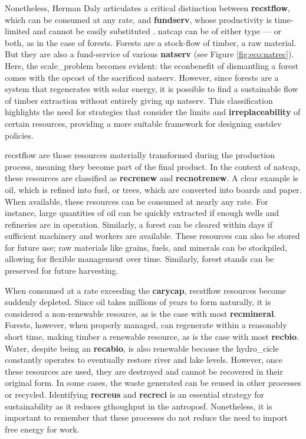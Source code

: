 \documentclass[./main_en.tex]{subfiles}
\begin{document}
\par Nonetheless, Herman Daly articulates a critical distinction between \textbf{\gls{recstflow}}, which can be consumed at any rate, and \textbf{\gls{fundserv}}, whose productivity is time-limited and cannot be easily substituted \cite{daly2011}. \gls{natcap} can be of either type — or both, as in the case of forests. Forests are a stock-flow of timber, a raw material. But they are also a fund-service of various \textbf{\gls{natserv}} (see Figure \ref{fig:eco:natrec}). Here, the \gls{scale_problem} becomes evident: the \gls{econbenefit} of dismantling a forest comes with the \gls{opcost} of the sacrificed \gls{natserv}. However, since forests are a \gls{system} that regenerates with solar energy, it is possible to find a sustainable flow of timber extraction without entirely giving up \gls{natserv}. This classification highlights the need for strategies that consider the limits and \textbf{irreplaceability} of certain resources, providing a more suitable framework for designing \gls{sustdev} policies.

\par \gls{recstflow} are those resources materially transformed during the production process, meaning they become part of the final product. In the context of \gls{natcap}, these resources are classified as \textbf{\gls{recrenew}} and \textbf{\gls{recnotrenew}}. A clear example is oil, which is refined into fuel, or trees, which are converted into boards and paper. When available, these resources can be consumed at nearly any rate. For instance, large quantities of oil can be quickly extracted if enough wells and refineries are in operation. Similarly, a forest can be cleared within days if sufficient machinery and workers are available. These resources can also be stored for future use; raw materials like grains, fuels, and minerals can be stockpiled, allowing for flexible management over time. Similarly, forest stands can be preserved for future harvesting.

\par When consumed at a rate exceeding the \textbf{\gls{carycap}}, \gls{recstflow} resources become suddenly depleted. Since oil takes millions of years to form naturally, it is considered a non-renewable resource, as is the case with most \textbf{\gls{recmineral}}. Forests, however, when properly managed, can regenerate within a reasonably short time, making timber a renewable resource, as is the case with most \textbf{\gls{recbio}}. Water, despite being an \textbf{\gls{recabio}}, is also renewable because the \gls{hydro_cicle} constantly operates to eventually restore river and lake levels. However, once these resources are used, they are destroyed and cannot be recovered in their original form. In some cases, the waste generated can be reused in other processes or recycled. Identifying \textbf{\gls{recreus}} and \textbf{\gls{recreci}} is an essential strategy for sustainability as it reduces \gls{gthoughput} in the \gls{antroposf}. Nonetheless, it is important to remember that these processes do not reduce the need to import free energy for work.
\end{document}
